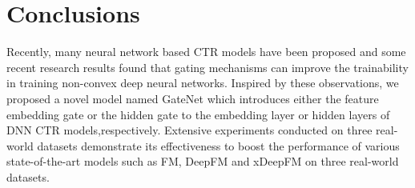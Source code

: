 \documentclass[sigconf,nonacm=true]{acmart}
\begin{document}
\section{Conclusions}
\label{sec:s5}
Recently, many neural network based CTR models have been proposed and some recent research results found that gating mechanisms can improve the trainability in training non-convex deep neural networks. Inspired by these observations, we proposed a novel model named GateNet which introduces either the feature embedding gate or the hidden gate to the embedding layer or hidden layers of DNN CTR models,respectively. Extensive experiments conducted on three real-world datasets demonstrate its effectiveness to boost the performance of various state-of-the-art models such as FM, DeepFM and xDeepFM on three real-world datasets.



\end{document}
